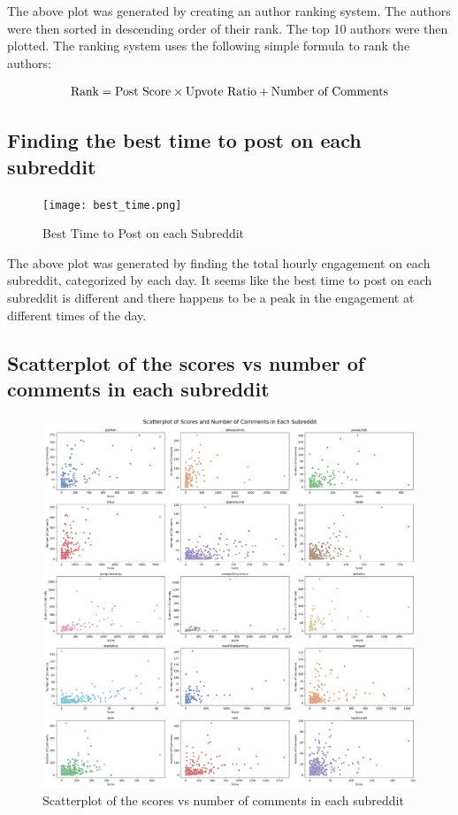 \documentclass[12pt, letterpage]{article}
\begin{document}
The above plot was generated by creating an author ranking system. The authors were then sorted in descending order of their rank. The top 10 authors were then plotted. The ranking system uses the following simple formula to rank the authors:

\begin{equation}
    \textnormal{Rank} = \textnormal{Post Score} \times \textnormal{Upvote Ratio} + \textnormal{Number of Comments}
\end{equation}

\subsection*{Finding the best time to post on each subreddit}

\begin{figure}[H]
    \centering
    \texttt{[image: best\_time.png]}
    \caption{Best Time to Post on each Subreddit}
    \label{fig:best_time_to_post}
\end{figure}

The above plot was generated by finding the total hourly engagement on each subreddit, categorized by each day. It seems like the best time to post on each subreddit is different and there happens to be a peak in the engagement at different times of the day.

\subsection*{Scatterplot of the scores vs number of comments in each subreddit}

\begin{figure}[H]
    \centering
    \includegraphics[width=1\textwidth]{scatterplot_scores.png}
    \caption{Scatterplot of the scores vs number of comments in each subreddit}
    \label{fig:score_vs_comments}
\end{figure}
\end{document}

